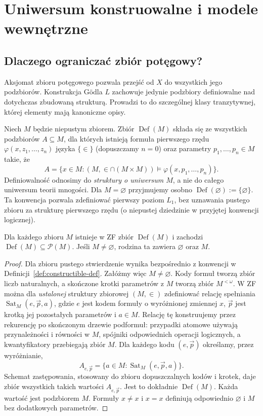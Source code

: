 \chapter{Uniwersum konstruowalne i modele wewnętrzne}\label{ch:constructible}
\section{Dlaczego ograniczać zbiór potęgowy?}
Aksjomat zbioru potęgowego pozwala przejść od $X$ do wszystkich jego podzbiorów. Konstrukcja Gödla $L$ zachowuje jedynie podzbiory definiowalne nad dotychczas zbudowaną strukturą. Prowadzi to do szczególnej klasy tranzytywnej, której elementy mają kanoniczne opisy.
\begin{definicja}\label{def:constructible-def}
Niech $M$ będzie niepustym zbiorem. Zbiór
$\operatorname{Def}(M)$ składa się ze wszystkich podzbiorów
$A\subseteq M$, dla których istnieją formuła pierwszego rzędu
$\varphi(x,z_1,\ldots,z_n)$ języka $\{\in\}$ (dopuszczamy $n=0$)
oraz parametry $p_1,\ldots,p_n\in M$ takie, że
\[
 A=\{x\in M:(M,\in\cap(M\times M))\models
       \varphi(x,p_1,\ldots,p_n)\}.
\]
Definiowalność odnosimy do \emph{struktury o uniwersum $M$},
a nie do całego uniwersum teorii mnogości.
Dla $M=\varnothing$ przyjmujemy osobno
$\operatorname{Def}(\varnothing):=\{\varnothing\}$.
Ta konwencja pozwala zdefiniować pierwszy poziom $L_1$,
bez uznawania pustego zbioru za strukturę pierwszego rzędu
(o niepustej dziedzinie w przyjętej konwencji logicznej).
\end{definicja}
\begin{lemat}
\label{lem:def-set}
Dla każdego zbioru $M$ istnieje w ZF zbiór
$\operatorname{Def}(M)$ i zachodzi
$\operatorname{Def}(M)\subseteq\mathcal P(M)$.
Jeśli $M\ne\varnothing$, rodzina ta zawiera $\varnothing$
oraz $M$.
\end{lemat}
\begin{proof}
Dla zbioru pustego stwierdzenie wynika bezpośrednio
z konwencji w Definicji~\ref{def:constructible-def}.
Załóżmy więc $M\ne\varnothing$. Kody formuł tworzą zbiór
liczb naturalnych, a skończone krotki parametrów z $M$
tworzą zbiór $M^{<\omega}$. W ZF można dla \emph{ustalonej}
struktury zbiorowej $(M,\in)$ zdefiniować relację spełniania
$\operatorname{Sat}_M(e,\vec p,a)$, gdzie $e$ jest kodem
formuły o wyróżnionej zmiennej $x$, $\vec p$ jest krotką
jej pozostałych parametrów i $a\in M$. Relację tę
konstruujemy przez rekurencję po skończonym drzewie
podformuł: przypadki atomowe używają przynależności i
równości w $M$, spójniki odpowiednich operacji logicznych,
a kwantyfikatory przebiegają zbiór $M$.
Dla każdego kodu $(e,\vec p)$ określamy, przez wyróżnianie,
\[
 A_{e,\vec p}=\{a\in M:\operatorname{Sat}_M(e,\vec p,a)\}.
\]
Schemat zastępowania, stosowany do zbioru dopuszczalnych
kodów i krotek, daje zbiór wszystkich takich wartości
$A_{e,\vec p}$. Jest to dokładnie $\operatorname{Def}(M)$.
Każda wartość jest podzbiorem $M$. Formuły $x\ne x$
i $x=x$ definiują odpowiednio $\varnothing$ i $M$
bez dodatkowych parametrów.
\end{proof}

